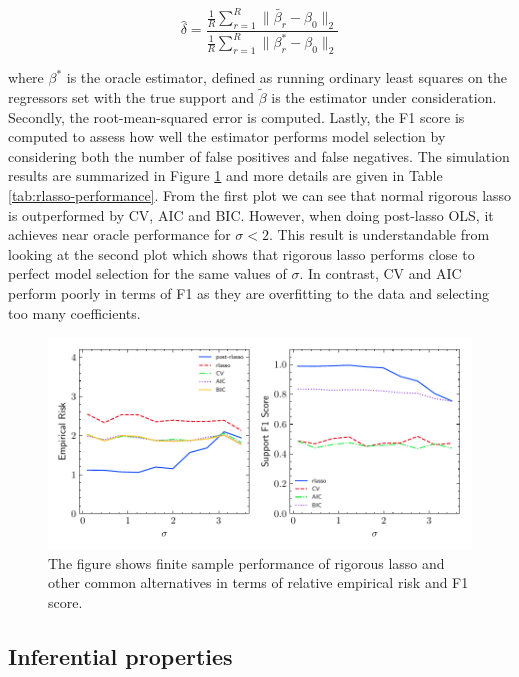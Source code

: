 \documentclass[11pt, reqno]{amsart} \usepackage{pstricks} %
\begin{document}
\begin{equation}
\label{eq:empirical risk}
\hat{\delta} = \frac{ \frac{1}{R} \sum_{r=1}^{R} \lVert \tilde{\beta_{r}} -
\beta_0 \rVert_2 }
{\frac{1}{R} \sum_{r=1}^{R} \lVert {\beta_{r}^{*}} -
\beta_0 \rVert_2 }
\end{equation}

\noindent where $\beta^*$ is the oracle estimator, defined as running ordinary
least squares on the regressors set with the true support and $\tilde{\beta}$
is the estimator under consideration. Secondly, the root-mean-squared error is
computed. Lastly, the F1 score is computed to assess how well the estimator
performs model selection by considering both the number of false positives and
false negatives. The simulation results are summarized in Figure
\ref{fig:rlasso-performance} and more details are given in Table
\ref{tab:rlasso-performance}. From the first plot we can see that normal
rigorous lasso is outperformed by CV, AIC and BIC. However, when doing
post-lasso OLS, it achieves near oracle performance for $\sigma < 2$. This
result is understandable from looking at the second plot which shows that
rigorous lasso performs close to perfect model selection for the same values of
$\sigma$. In contrast, CV and AIC perform poorly in terms of F1 as they are
overfitting to the data and selecting too many coefficients.


\begin{figure}[h]
  \centering
  \includegraphics[width=\textwidth]{../outputs/figs/rlasso-oracle.pdf}
  \caption{The figure shows finite sample performance of rigorous lasso and
    other common alternatives in terms of relative empirical risk and F1 score.}
  \label{fig:rlasso-performance}
\end{figure}

\subsection{Inferential properties}
\end{document}
